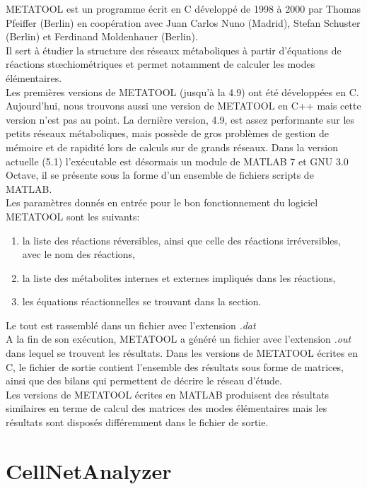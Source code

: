 \documentclass[12pt,a4paper]{report}
\begin{document}
\noindent METATOOL est un programme écrit en C développé de 1998 à 2000 par Thomas Pfeiffer (Berlin) en coopération avec Juan Carlos Nuno (Madrid), Stefan Schuster (Berlin) et Ferdinand Moldenhauer (Berlin).\\
Il sert à étudier la structure des réseaux métaboliques à partir d'équations de réactions stœchiométriques et permet notamment de calculer les modes élémentaires.\\
Les premières versions de METATOOL (jusqu'à la 4.9) ont été développées en C. Aujourd'hui, nous trouvons aussi une version de METATOOL en C++ mais cette version n'est pas au point. La dernière version, 4.9, est assez performante sur les petits réseaux métaboliques, mais possède de gros problèmes de gestion de mémoire et de rapidité lors de calculs sur de grands réseaux.
Dans la version actuelle (5.1) l'exécutable est désormais un module de MATLAB 7 et GNU 3.0 Octave, il se présente sous la forme d'un ensemble de fichiers scripts de MATLAB.\\

\noindent Les paramètres donnés en entrée pour le bon fonctionnement du logiciel METATOOL sont les suivants:
\begin{enumerate}
\item la liste des réactions réversibles, ainsi que celle des réactions irréversibles, avec le nom des réactions,
\item la liste des métabolites internes et externes impliqués dans les réactions,
\item les équations réactionnelles se trouvant dans la section.
\end{enumerate}
Le tout est rassemblé dans un fichier avec l'extension \textit{.dat}\\

\noindent A la fin de son exécution, METATOOL a généré un fichier avec l'extension \textit{.out} dans lequel se trouvent les résultats. Dans les versions de METATOOL écrites en C, le fichier de sortie contient l'ensemble des résultats sous forme de matrices, ainsi que des bilans qui permettent de décrire le réseau d'étude.\\
Les versions de METATOOL écrites en MATLAB produisent des résultats similaires en terme de calcul des matrices des modes élémentaires mais les résultats sont disposés différemment dans le fichier de sortie.

\section{CellNetAnalyzer}
\end{document}
